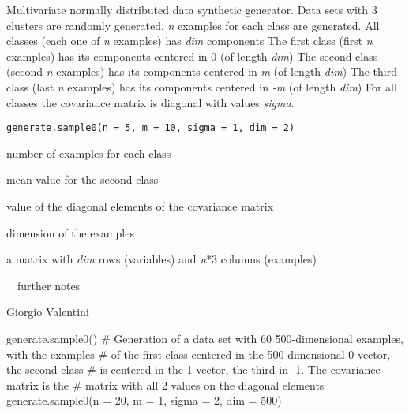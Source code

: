\documentclass{article}
\begin{document}
\begin{Description}\relax
Multivariate normally  distributed data synthetic generator.
Data sets with 3 clusters are randomly generated.
\emph{n} examples for each class are generated.
All classes (each one of \emph{n} examples) has \emph{dim} components 
The first class (first \emph{n} examples) has its  components centered in  0 (of length \emph{dim})
The second class (second \emph{n} examples) has its   components centered in  \emph{m} (of length \emph{dim})
The third class (last \emph{n} examples) has its   components centered in \emph{-m} (of length \emph{dim})
For all classes the covariance matrix is diagonal with values \emph{sigma}.
\end{Description}
\begin{Usage}
\begin{verbatim}
generate.sample0(n = 5, m = 10, sigma = 1, dim = 2)
\end{verbatim}
\end{Usage}
\begin{Arguments}
\begin{ldescription}
\item[\code{n}] number of examples for each class 
\item[\code{m}] mean value for the second class 
\item[\code{sigma}] value of the diagonal elements of the covariance matrix 
\item[\code{dim}] dimension of the examples
\end{ldescription}
\end{Arguments}
\begin{Value}
a matrix with \emph{dim} rows (variables) and \emph{n}*3 columns (examples)
\end{Value}
\begin{Note}\relax
~~further notes~~
\end{Note}
\begin{Author}\relax
Giorgio Valentini 
\end{Author}
\begin{Examples}
\begin{ExampleCode}
generate.sample0()
# Generation of a data set with 60 500-dimensional examples, with the examples 
# of the first class  centered in the 500-dimensional 0 vector, the second class 
# is centered in the 1 vector, the third in -1. The covariance matrix is the
# matrix with all 2 values on the diagonal elements
generate.sample0(n = 20, m = 1, sigma = 2, dim = 500)
\end{ExampleCode}
\end{Examples}
\end{document}
